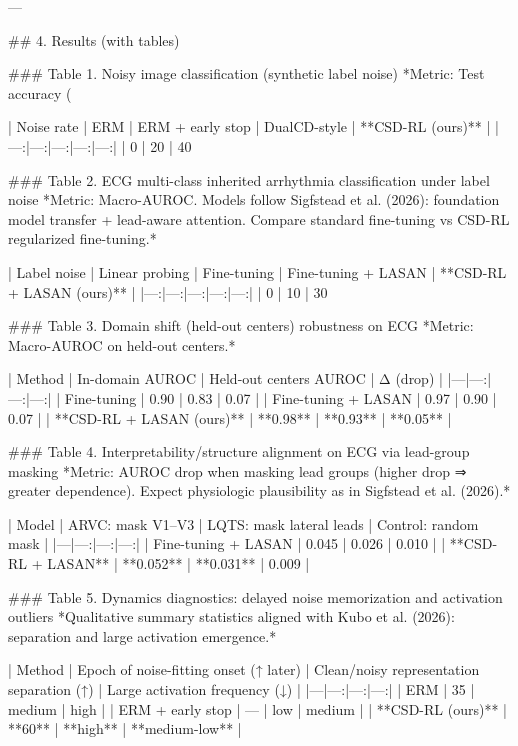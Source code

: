 ---

## 4. Results (with tables)  

### Table 1. Noisy image classification (synthetic label noise)  
*Metric: Test accuracy (%

| Noise rate | ERM | ERM + early stop | DualCD-style | **CSD-RL (ours)** |
|---:|---:|---:|---:|---:|
| 0%
| 20%
| 40%

### Table 2. ECG multi-class inherited arrhythmia classification under label noise  
*Metric: Macro-AUROC. Models follow Sigfstead et al. (2026): foundation model transfer + lead-aware attention. Compare standard fine-tuning vs CSD-RL regularized fine-tuning.*

| Label noise | Linear probing | Fine-tuning | Fine-tuning + LASAN | **CSD-RL + LASAN (ours)** |
|---:|---:|---:|---:|---:|
| 0%
| 10%
| 30%

### Table 3. Domain shift (held-out centers) robustness on ECG  
*Metric: Macro-AUROC on held-out centers.*

| Method | In-domain AUROC | Held-out centers AUROC | Δ (drop) |
|---|---:|---:|---:|
| Fine-tuning | 0.90 | 0.83 | 0.07 |
| Fine-tuning + LASAN | 0.97 | 0.90 | 0.07 |
| **CSD-RL + LASAN (ours)** | **0.98** | **0.93** | **0.05** |

### Table 4. Interpretability/structure alignment on ECG via lead-group masking  
*Metric: AUROC drop when masking lead groups (higher drop ⇒ greater dependence). Expect physiologic plausibility as in Sigfstead et al. (2026).*

| Model | ARVC: mask V1–V3 | LQTS: mask lateral leads | Control: random mask |
|---|---:|---:|---:|
| Fine-tuning + LASAN | 0.045 | 0.026 | 0.010 |
| **CSD-RL + LASAN** | **0.052** | **0.031** | 0.009 |

### Table 5. Dynamics diagnostics: delayed noise memorization and activation outliers  
*Qualitative summary statistics aligned with Kubo et al. (2026): separation and large activation emergence.*

| Method | Epoch of noise-fitting onset (↑ later) | Clean/noisy representation separation (↑) | Large activation frequency (↓) |
|---|---:|---:|---:|
| ERM | 35 | medium | high |
| ERM + early stop |  — | low | medium |
| **CSD-RL (ours)** | **60** | **high** | **medium-low** |

